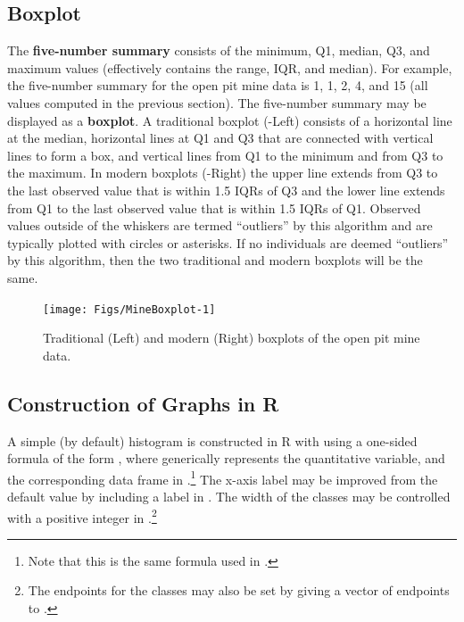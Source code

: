 \documentclass[10pt,openany]{book}\usepackage[]{graphicx}\usepackage[]{color}
\newenvironment{knitrout}{}{} %
\begin{document}
\subsection{Boxplot}
The \textbf{five-number summary} consists of the minimum, Q1, median, Q3, and maximum values (effectively contains the range, IQR, and median). For example, the five-number summary for the open pit mine data is 1, 1, 2, 4, and 15 (all values computed in the previous section). The five-number summary may be displayed as a \textbf{boxplot}. A traditional boxplot (-Left) consists of a horizontal line at the median, horizontal lines at Q1 and Q3 that are connected with vertical lines to form a box, and vertical lines from Q1 to the minimum and from Q3 to the maximum. In modern boxplots (-Right) the upper line extends from Q3 to the last observed value that is within 1.5 IQRs of Q3 and the lower line extends from Q1 to the last observed value that is within 1.5 IQRs of Q1. Observed values outside of the whiskers are termed ``outliers'' by this algorithm and are typically plotted with circles or asterisks. If no individuals are deemed ``outliers'' by this algorithm, then the two traditional and modern boxplots will be the same.

\begin{knitrout}
\color{fgcolor}\begin{figure}[hbtp]

{\centering \texttt{[image: Figs/MineBoxplot-1]} 

}

\caption[Traditional (Left) and modern (Right) boxplots of the open pit mine data]{Traditional (Left) and modern (Right) boxplots of the open pit mine data.}\label{fig:MineBoxplot}
\end{figure}


\end{knitrout}


\subsection{Construction of Graphs in R}
A simple (by default) histogram is constructed in R with  using a one-sided formula of the form , where  generically represents the quantitative variable, and the corresponding data frame in .\footnote{Note that this is the same formula used in .} The x-axis label may be improved from the default value by including a label in . The width of the classes may be controlled with a positive integer in .\footnote{The endpoints for the classes may also be set by giving a vector of endpoints to .}
\end{document}
